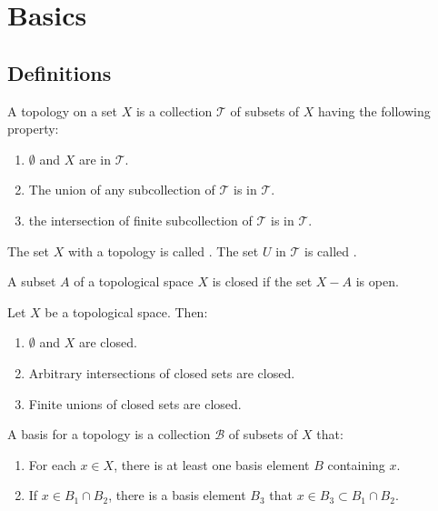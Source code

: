 \chapter{Basics}

\section{Definitions}

\begin{definition}
    A topology on a set $X$ is a collection $\mathcal{T}$ of subsets of $X$ having the following property:
    \begin{enumerate}
        \item $\emptyset$ and $X$ are in $\mathcal{T}$.
        \item The union of any subcollection of $\mathcal{T}$ is in $\mathcal{T}$.
        \item the intersection of finite subcollection of $\mathcal{T}$ is in $\mathcal{T}$.
    \end{enumerate}

The set $X$ with a topology is called . The set $U$ in $\mathcal{T}$ is called .
\end{definition}

\begin{definition}
    A subset $A$ of a topological space $X$ is closed if the set $X - A$ is open.
\end{definition}

\begin{definition}
    Let $X$ be a topological space. Then:
    \begin{enumerate}
        \item $\emptyset$ and $X$ are closed.
        \item Arbitrary intersections of closed sets are closed.
        \item Finite unions of closed sets are closed.
    \end{enumerate}
\end{definition}

\begin{definition}
    A basis for a topology is a collection $\mathcal{B}$ of subsets of $X$ that:
    \begin{enumerate}
        \item For each $x \in X$, there is at least one basis element $B$ containing $x$.
        \item If $x \in B_1 \cap B_2$, there is a basis element $B_3$ that $x \in B_3 \subset B_1 \cap B_2$.
    \end{enumerate}
\end{definition}

